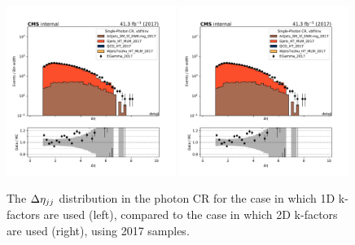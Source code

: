\begin{figure}
    \begin{center}
        \includegraphics[width=0.49\textwidth]{fig/datamc/cr_g_vbf/cr_g_vbf_detajj_losf_2017.pdf}
        \includegraphics[width=0.49\textwidth]{fig/datamc_2dkfac/cr_g_vbf/cr_g_vbf_detajj_losf_2017.pdf} 
        \caption{The $\Delta \eta_{jj}$ distribution in the photon CR for the case in which 1D k-factors are used (left), 
        compared to the case in which 2D k-factors are used (right), using 2017 samples.}
        \label{fig:detajj_2017}
    \end{center}
\end{figure}


